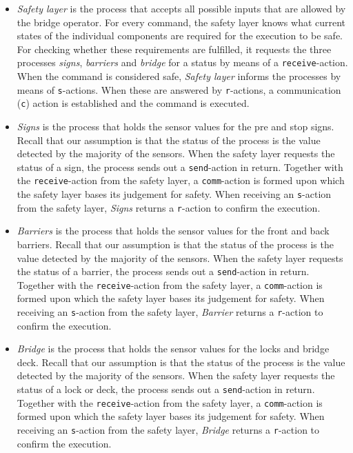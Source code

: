 \begin{itemize}
	\item \emph{Safety layer} is the process that accepts all possible inputs
		that are allowed by the bridge operator. For every command, the safety
		layer knows what current states of the individual components are
		required for the execution to be safe. For checking whether these
		requirements are fulfilled, it requests the three processes
		\emph{signs}, \emph{barriers} and \emph{bridge} for a status by means
		of a \texttt{receive}-action.  When the command is considered safe,
		\emph{Safety layer} informs the processes by means of
		\texttt{s}-actions. When these are answered by \texttt{r}-actions, a
		communication (\texttt{c}) action is established and the command is
		executed.
	\item \emph{Signs} is the process that holds the sensor values for the pre and stop signs. Recall that our assumption is that the status of the process is the value detected by the majority of the sensors. When the safety layer
	requests the status of a sign, the process sends out a \texttt{send}-action in return. Together with the \texttt{receive}-action from the safety layer, a \texttt{comm}-action is formed upon which the safety layer bases its
	judgement for safety. When receiving an \texttt{s}-action from the safety layer, \emph{Signs} returns a \texttt{r}-action to confirm the execution.
	\item \emph{Barriers} is the process that holds the sensor values for the front and back barriers. Recall that our assumption is that the status of the process is the value detected by the majority of the sensors. When the
	safety layer requests the status of a barrier, the process sends out a \texttt{send}-action in return. Together with the \texttt{receive}-action from the safety layer, a \texttt{comm}-action is formed upon which the safety layer
	bases its judgement for safety. When receiving an \texttt{s}-action from the safety layer, \emph{Barrier} returns a \texttt{r}-action to confirm the execution.
	\item \emph{Bridge} is the process that holds the sensor values for the locks and bridge deck. Recall that our assumption is that the status of the process is the value detected by the majority of the sensors. When the
	safety layer requests the status of a lock or deck, the process sends out a \texttt{send}-action in return. Together with the \texttt{receive}-action from the safety layer, a \texttt{comm}-action is formed upon which the safety
	layer 	bases its judgement for safety. When receiving an \texttt{s}-action from the safety layer, \emph{Bridge} returns a \texttt{r}-action to confirm the execution.
\end{itemize}
